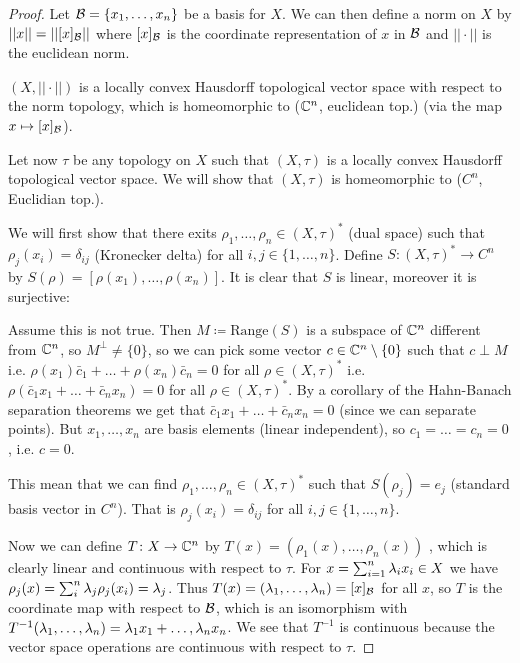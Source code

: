 \documentclass[10pt,english,a4paper]{article}
\theoremstyle{definition}
\begin{document}
\begin{proof}
    Let $\mathcal{B} = \{x_1,\ldots, x_n\}$ be a basis for $X$. We can then define a 
norm on $X$ by $||x|| = ||[x]_{\mathcal{B}}||$ where $[x]_{\mathcal{B}}$ is the coordinate
representation of $x$ in $\mathcal{B}$ and $||\cdot ||$ is the euclidean norm. 

$(X, ||\cdot ||)$ is a locally convex Hausdorff topological vector space with 
respect to the norm topology, which is homeomorphic to ($\mathbb{C}^n$, euclidean top.) (via the map $x\mapsto [x]_{\mathcal{B}}$). 

Let now $\tau$ be any topology on $X$ such that $(X,\tau)$ is a locally 
convex Hausdorff topological vector space. We will show that $(X,\tau)$
is homeomorphic to ($C^n$,  Euclidian top.).

We will first show that there exits $\rho_1,\ldots, \rho_n \in (X,\tau)^{*}$
(dual space) such that $\rho_j(x_i) = \delta_{ij}$ (Kronecker delta) for all 
$i,j \in \{1,\ldots, n\}$. Define $S\colon (X,\tau)^* \to C^n$
by $S(\rho) = [\rho(x_1),\ldots, \rho(x_n)]$. It is clear that $S$ is linear,
moreover it is surjective:

Assume this is not true. Then $M \coloneqq \text{Range}(S)$ is a subspace of $\mathbb{C}^n$
different from $\mathbb{C}^n$, so $M^{\perp}\neq \{0\}$, so we can pick some vector 
$c \in \mathbb{C}^n \setminus \{0\}$ such that $c\perp M$ i.e. $\rho(x_1)\bar{c}_1 + 
\ldots + \rho(x_n)\bar{c}_n = 0$ for all $\rho \in (X, \tau)^*$ i.e.
$\rho(\bar{c}_1x_1 + \ldots + \bar{c}_n x_n) =  0 $ for all $\rho \in (X,\tau)^*$.
By a corollary of the Hahn-Banach separation theorems we get that 
$\bar{c}_1 x_1 + \ldots + \bar{c}_n x_n  = 0$ (since we can separate points).
But $x_1,\ldots, x_n$ are basis elements (linear independent), so 
$c_1 = \ldots = c_n = 0$, i.e. $c=0$.

This mean that we can find $\rho_1,\ldots, \rho_n \in (X,\tau)^*$
such that $S(\rho_j) = e_j $ (standard basis vector in $C^n$).
That is $\rho_{j}(x_i) =\delta_{ij}$ for all $i,j \in \{1,\ldots,n\}$.

Now we can define $T\colon X \to \mathbb{C}^n$ by $T(x) = (\rho_1 (x),\ldots,
\rho_n(x))$ , which is clearly linear and continuous with respect to $\tau$.  For $x =
\sum_{i=1}^{n}\lambda_i x_i \in X$ we have $\rho_{j}(x) =\sum_{i}^{n}
\lambda_{j}\rho_j(x_i) = \lambda_j$. Thus $T(x) = (\lambda_1,\ldots,\lambda_n) = [x]_{\mathcal{B}}$ for
all $x$, so $T$ is the coordinate map with respect to $\mathcal{B}$, which is an
isomorphism with $T^{-1}(\lambda_1,\ldots,\lambda_n) = \lambda_1x_1 + \ldots, \lambda_nx_n$. We
see that $T^{-1}$ is continuous because the vector space operations are
continuous with respect to $\tau$.
\end{proof}
\end{document}
